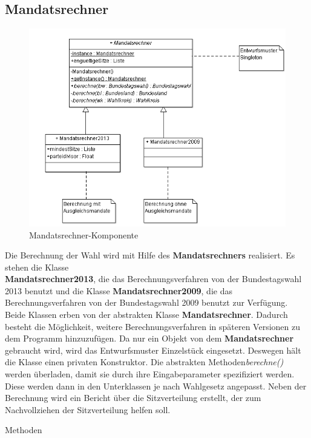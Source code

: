 \documentclass[12pt,a4paper,titlepage]{article}
\newcommand{\myma}{\fontfamily{pcr}\selectfont \textbf}
\newcommand{\mymo}{\fontfamily{pcr}\selectfont \textit}
\begin{document}
\subsection{Mandatsrechner}
\begin{figure}[!ht]
\centering
\includegraphics[scale=0.6]{Mandatsrechneralles.png} \caption{Mandatsrechner-Komponente} 
\end{figure}
Die Berechnung der Wahl wird mit Hilfe des {\myma{Mandatsrechners}} realisiert. Es stehen die Klasse \\{\myma{Mandatsrechner2013}}, die das Berechnungsverfahren von der Bundestagswahl 2013 benutzt und die Klasse {\myma{Mandatsrechner2009}}, die das Berechnungsverfahren von der Bundestagswahl 2009 benutzt zur Verfügung. Beide Klassen erben von der abstrakten Klasse {\myma{Mandatsrechner}}. Dadurch besteht die Möglichkeit, weitere Berechnungsverfahren in späteren Versionen zu dem Programm hinzuzufügen. Da nur ein Objekt von dem {\myma{Mandatsrechner}} gebraucht wird, wird das Entwurfsmuster Einzelstück eingesetzt. Deswegen hält die Klasse einen privaten Konstruktor. Die abstrakten Methoden{\mymo{berechne()}} werden überladen, damit sie durch ihre Eingabeparameter spezifiziert werden. Diese werden dann in den Unterklassen je nach Wahlgesetz angepasst. Neben der Berechnung wird ein Bericht über die Sitzverteilung erstellt, der zum Nachvollziehen der Sitzverteilung helfen soll.
\begin{large}
Methoden 
\end{large}
\end{document}
